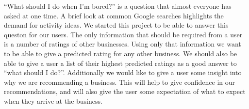``What should I do when I'm bored?''  is a question that almost everyone has
asked at one time. A brief look at common Google searches highlights the demand
for activity ideas. We started this project to be able to answer this queston
for our users. The only information that should be required from a user is 
a number of ratings of other businesses. Using only that information we want to
be able to give a predicted rating for any other business. We should also be
able to give a user a list of their highest predicted ratings as a good answer
to ``what should I do?''. Additionally we would like to give a user some insight
into why we are recommending a business. This will help to give confidence in
our recommendations, and will also give the user some expectation of what to
expect when they arrive at the business.
